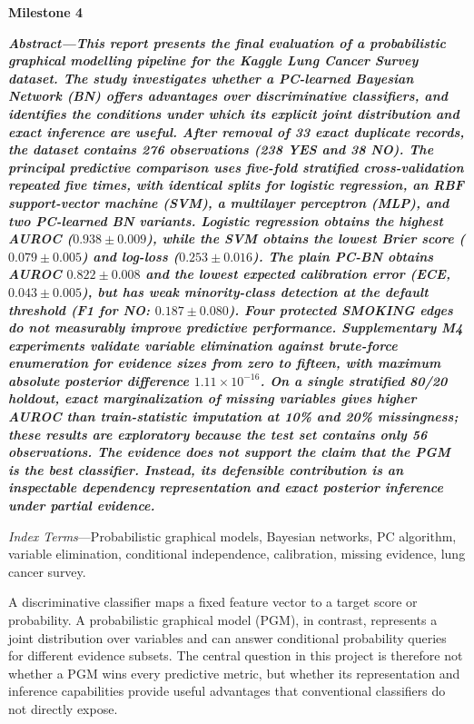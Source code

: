 \documentclass[10pt,twocolumn,letterpaper]{article}
\makeatletter
\renewcommand\section{\@startsection{section}{1}{\z@}{1.5ex plus 0.5ex minus 0.2ex}{1ex plus 0.2ex}{\centering\normalfont\footnotesize\scshape}}
\newcommand{\us}{\textunderscore\allowbreak}
\newcommand{\var}[1]{{\small\ttfamily\let\_\us #1}}
\newcommand{\startms}{\setcounter{section}{0}\setcounter{table}{0}\setcounter{figure}{0}\setcounter{equation}{0}}
\newcommand{\msheader}[3]{\par\vspace{6pt}\begin{center}{\large\bfseries #1}\end{center}\vspace{-2pt}
{\small\bfseries\itshape\noindent\textit{Abstract}---#2\par\vspace{2pt}\noindent\textit{Index Terms}---#3\par}\vspace{2pt}\startms}
\makeatother
\begin{document}
\msheader{Milestone 4}%
{This report presents the final evaluation of a probabilistic graphical modelling pipeline for the Kaggle Lung Cancer Survey dataset. The study investigates whether a PC-learned Bayesian Network (BN) offers advantages over discriminative classifiers, and identifies the conditions under which its explicit joint distribution and exact inference are useful. After removal of 33 exact duplicate records, the dataset contains 276 observations (238 YES and 38 NO). The principal predictive comparison uses five-fold stratified cross-validation repeated five times, with identical splits for logistic regression, an RBF support-vector machine (SVM), a multilayer perceptron (MLP), and two PC-learned BN variants. Logistic regression obtains the highest AUROC ($0.938\pm0.009$), while the SVM obtains the lowest Brier score ($0.079\pm0.005$) and log-loss ($0.253\pm0.016$). The plain PC-BN obtains AUROC $0.822\pm0.008$ and the lowest expected calibration error (ECE, $0.043\pm0.005$), but has weak minority-class detection at the default threshold (F1 for NO: $0.187\pm0.080$). Four protected \var{SMOKING} edges do not measurably improve predictive performance. Supplementary M4 experiments validate variable elimination against brute-force enumeration for evidence sizes from zero to fifteen, with maximum absolute posterior difference $1.11\times10^{-16}$. On a single stratified 80/20 holdout, exact marginalization of missing variables gives higher AUROC than train-statistic imputation at 10\% and 20\% missingness; these results are exploratory because the test set contains only 56 observations. The evidence does not support the claim that the PGM is the best classifier. Instead, its defensible contribution is an inspectable dependency representation and exact posterior inference under partial evidence.}%
{Probabilistic graphical models, Bayesian networks, PC algorithm, variable elimination, conditional independence, calibration, missing evidence, lung cancer survey.}
\label{ms4}

\section{Introduction}
A discriminative classifier maps a fixed feature vector to a target score or probability. A probabilistic graphical model (PGM), in contrast, represents a joint distribution over variables and can answer conditional probability queries for different evidence subsets. The central question in this project is therefore not whether a PGM wins every predictive metric, but whether its representation and inference capabilities provide useful advantages that conventional classifiers do not directly expose.
\end{document}
